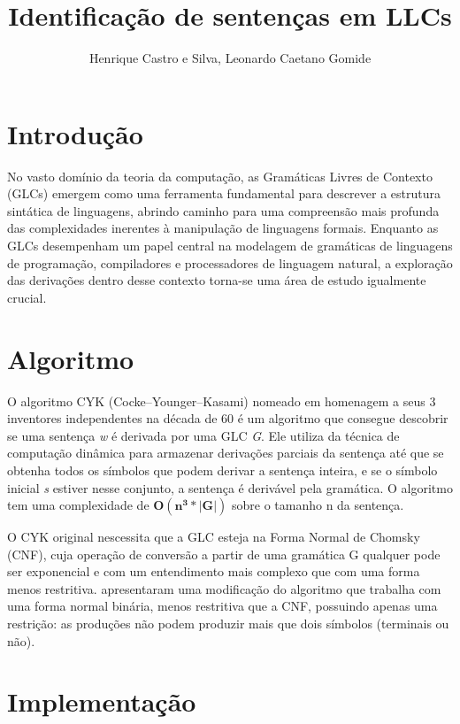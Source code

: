 \documentclass[12pt]{article}
\title{Identificação de sentenças em LLCs}
\author{Henrique Castro e Silva\inst{1}, Leonardo Caetano Gomide\inst{1}}
\begin{document}
 

\maketitle


\section{Introdução}


No vasto domínio da teoria da computação, as Gramáticas Livres de Contexto (GLCs) emergem como uma ferramenta fundamental para descrever a estrutura sintática de linguagens, abrindo caminho para uma compreensão mais profunda das complexidades inerentes à manipulação de linguagens formais. Enquanto as GLCs desempenham um papel central na modelagem de gramáticas de linguagens de programação, compiladores e processadores de linguagem natural, a exploração das derivações dentro desse contexto torna-se uma área de estudo igualmente crucial.

\section{Algoritmo} \label{sec:firstpage}

O algoritmo CYK (Cocke–Younger–Kasami) nomeado em homenagem a seus 3 inventores independentes na década de 60 é um algoritmo que consegue descobrir se uma sentença \textit{w} é derivada por uma GLC \textit{G}. Ele utiliza da técnica de computação dinâmica para armazenar derivações parciais da sentença até que se obtenha todos os símbolos que podem derivar a sentença inteira, e se o símbolo inicial \textit{s} estiver nesse conjunto, a sentença é derivável pela gramática. O algoritmo tem uma complexidade de $\mathbf{O(n^3 * |G|)}$ sobre o tamanho n da sentença.

O CYK original nescessita que a GLC esteja na Forma Normal de Chomsky (CNF), cuja operação de conversão a partir de uma gramática G qualquer pode ser exponencial e com um entendimento mais complexo que com uma forma menos restritiva. \cite{2nf:Lange} apresentaram uma modificação do algoritmo que trabalha com uma forma normal binária, menos restritiva que a CNF, possuindo apenas uma restrição: as produções não podem produzir mais que dois símbolos (terminais ou não). 

\section{Implementação}
\end{document}
